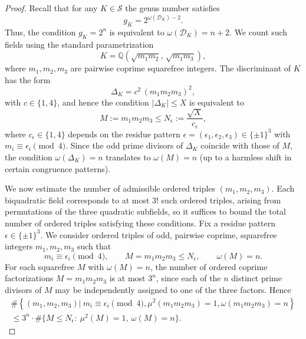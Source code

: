 \documentclass[12 pt]{amsart}
\newcommand{\cS}{\mathcal{S}}
\newcommand\cD{{\mathcal{D}}}
\newcommand{\Q}{\mathbb{Q}}
\theoremstyle{definition}
\theoremstyle{remark}
\begin{document}
\begin{proof}
	Recall that for any $K\in\cS$ the genus number satisfies 
	\[
	g_K = 2^{\omega(\cD_K)-2}.
	\]
	Thus, the condition $g_K=2^n$ is equivalent to $\omega(\cD_K)=n+2$. We count such fields using the standard parametrization
	\[
	K = \Q(\sqrt{m_1m_2},\,\sqrt{m_1m_3}),
	\]
	where $m_1,m_2,m_3$ are pairwise coprime squarefree integers.  
	The discriminant of $K$ has the form
	\[
	\Delta_K = c^2\,(m_1m_2m_3)^2,
	\]
	with $c\in\{1,4\}$, and hence the condition $|\Delta_K|\le X$ is equivalent to
	\[
	M := m_1m_2m_3 \le N_\epsilon := \frac{\sqrt{X}}{c_\epsilon},
	\]
	where $c_\epsilon\in\{1,4\}$ depends on the residue pattern 
	$\epsilon=(\epsilon_1,\epsilon_2,\epsilon_3)\in\{\pm1\}^3$
	with $m_i\equiv\epsilon_i\pmod{4}$.  
	Since the odd prime divisors of $\Delta_K$ coincide with those of $M$,  
	the condition $\omega(\Delta_K)=n$ translates to $\omega(M)=n$
	(up to a harmless shift in certain congruence patterns).
	
	We now estimate the number of admissible ordered triples $(m_1,m_2,m_3)$.
	Each biquadratic field corresponds to at most $3!$ such ordered triples, arising from
	permutations of the three quadratic subfields, so it suffices to bound the total number of ordered triples satisfying these conditions.
	Fix a residue pattern $\epsilon\in\{\pm1\}^3$.  
	We consider ordered triples of odd, pairwise coprime, squarefree integers $m_1,m_2,m_3$
	such that
	\[
	m_i\equiv\epsilon_i\pmod{4}, \qquad M=m_1m_2m_3\le N_\epsilon, \qquad \omega(M)=n.
	\]
	For each squarefree $M$ with $\omega(M)=n$, the number of ordered coprime factorizations
	$M=m_1m_2m_3$ is at most $3^n$, since each of the $n$ distinct prime divisors of $M$
	may be independently assigned to one of the three factors.  
	Hence
	\begin{align*}
			\#\left\{(m_1,m_2,m_3) \big\vert \ m_i\equiv \epsilon_i\pmod{4},  \mu^2(m_1m_2m_3)=1,\omega(m_1m_2m_3)=n\right\}\\
		\le 3^n\cdot \#\{M\le N_\epsilon:\ \mu^2(M)=1,\ \omega(M)=n\}.
	\end{align*}


\end{proof}
\end{document}
